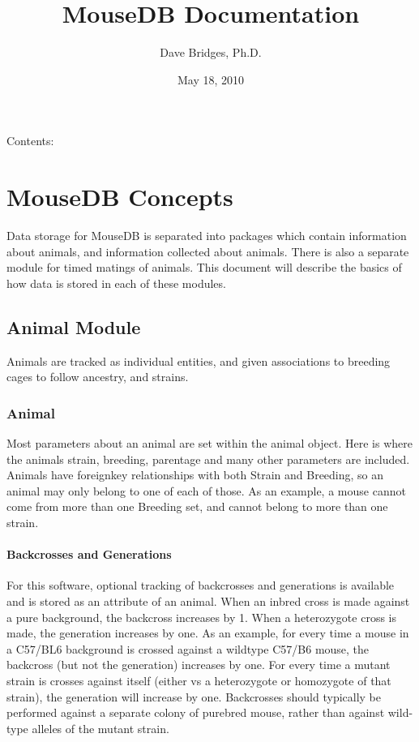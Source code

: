 \documentclass[letterpaper,10pt,english]{sphinxmanual}
\title{MouseDB Documentation}
\date{May 18, 2010}
\author{Dave Bridges, Ph.D.}
\begin{document}
\maketitle
\tableofcontents
\hypertarget{--doc-index}{}


Contents:

\resetcurrentobjects
\hypertarget{--doc-concepts}{}

\chapter{MouseDB Concepts}

Data storage for MouseDB is separated into packages which contain information about animals, and information collected about animals.  There is also a separate module for timed matings of animals.  This document will describe the basics of how data is stored in each of these modules.


\section{Animal Module}

Animals are tracked as individual entities, and given associations to breeding cages to follow ancestry, and strains.


\subsection{Animal}

Most parameters about an animal are set within the animal object.  Here is where the animals strain, breeding, parentage and many other parameters are included.  Animals have foreignkey relationships with both Strain and Breeding, so an animal may only belong to one of each of those.  As an example, a mouse cannot come from more than one Breeding set, and cannot belong to more than one strain.


\subsubsection{Backcrosses and Generations}

For this software, optional tracking of backcrosses and generations is available and is stored as an attribute of an animal.  When an inbred cross is made against a pure background, the backcross increases by 1.  When a heterozygote cross is made, the generation increases by one.  As an example, for every time a mouse in a C57/BL6 background is crossed against a wildtype C57/B6 mouse, the backcross (but not the generation) increases by one.  For every time a mutant strain is crosses against itself (either vs a heterozygote or homozygote of that strain), the generation will increase by one.  Backcrosses should typically be performed against a separate colony of purebred mouse, rather than against wild-type alleles of the mutant strain.
\end{document}
